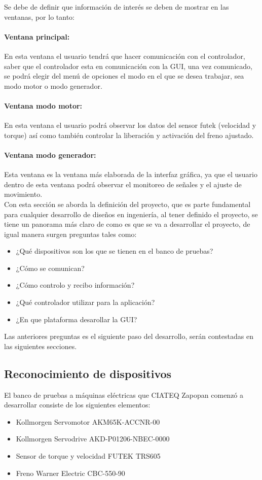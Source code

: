 \documentclass[12pt,titlepage]{article}
\begin{document}
Se debe de definir que información de interés se deben de mostrar en las ventanas, por lo tanto:  \\
\paragraph*{Ventana principal:} En esta ventana el usuario tendrá que hacer comunicación con el controlador, saber que el controlador esta en comunicación con la GUI, una vez comunicado, se podrá elegir del menú de opciones el modo en el que se desea trabajar, sea modo motor o modo generador. 
\paragraph*{Ventana modo motor:} En esta ventana el usuario podrá observar los datos del sensor futek (velocidad y torque) así como también controlar la liberación y activación del freno ajustado. 
\paragraph*{Ventana modo generador:} Esta ventana es la ventana más elaborada de la interfaz gráfica, ya que el usuario dentro de esta ventana podrá observar el monitoreo de señales y el ajuste de movimiento. \\[0.8cm]

Con esta sección se aborda la definición del proyecto, que es parte fundamental para cualquier desarrollo de diseños en ingeniería, al tener definido el proyecto, se tiene un panorama más claro de como es que se va a desarrollar el proyecto, de igual manera surgen preguntas tales como: \\

\begin{itemize}
\item ¿Qué dispositivos son los que se tienen en el banco de pruebas?
\item ¿Cómo se comunican?
\item ¿Cómo controlo y recibo información?
\item ¿Qué controlador utilizar para la aplicación?
\item ¿En que plataforma desarollar la GUI? 
\end{itemize}

Las anteriores preguntas es el siguiente paso del desarrollo, serán contestadas en las siguientes secciones. \\
\newpage
\subsection{Reconocimiento de dispositivos}
El banco de pruebas a máquinas eléctricas que CIATEQ Zapopan comenzó a desarrollar consiste de los siguientes elementos: \\
\begin{itemize}
\item Kollmorgen Servomotor AKM65K-ACCNR-00
\item Kollmorgen Servodrive AKD-P01206-NBEC-0000
\item Sensor de torque y velocidad FUTEK TRS605
\item Freno Warner Electric CBC-550-90
\end{itemize}
\end{document}
